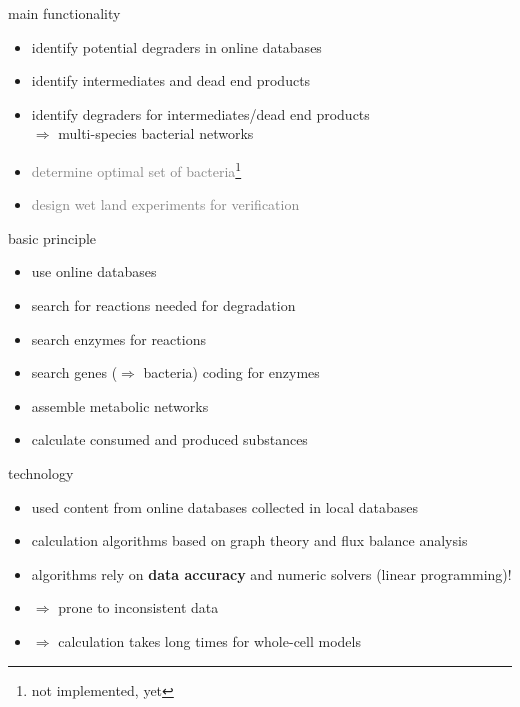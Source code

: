 \documentclass[style=ufz]{powerdot}
\begin{document}
\begin{slide}{main functionality}
\begin{itemize}
 \item identify potential degraders in online databases\newline\pause
 \item identify intermediates and dead end products\newline\pause
 \item identify degraders for intermediates/dead end products\newline\pause \\
 \indent $\Rightarrow$ multi-species bacterial networks\newline\pause
 \item \textcolor{gray}{determine optimal set of bacteria\footnote{not implemented, yet}}\newline\pause
 \item \textcolor{gray}{design wet land experiments for verification\footnotemark[1]}
\end{itemize}

\end{slide}

\begin{slide}{basic principle}
\begin{itemize}
 \item use online databases\newline\pause
 \item search for reactions needed for degradation\newline\pause
 \item search enzymes for reactions\newline\pause
 \item search genes ($\Rightarrow$ bacteria) coding for enzymes\newline\pause
 \item assemble metabolic networks\newline\pause
 \item calculate consumed and produced substances
\end{itemize}
\end{slide}

\begin{slide}{technology}
\begin{itemize}
 \item used content from online databases collected in local databases\newline\pause
 \item calculation algorithms based on graph theory and flux balance analysis\newline\pause
 \item algorithms rely on \textbf{data accuracy} and numeric solvers (linear programming)!\newline\pause
 \item $\Rightarrow$ prone to inconsistent data\newline\pause
 \item $\Rightarrow$ calculation takes long times for whole-cell models
\end{itemize}
\end{slide}
\end{document}
